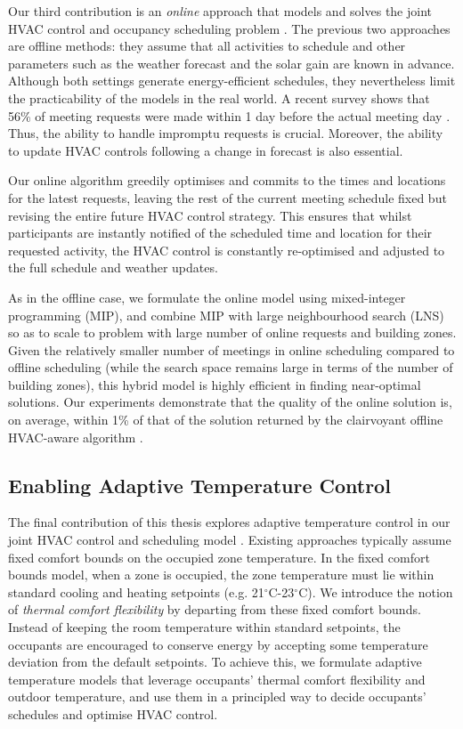 Our third contribution is an \emph{online} approach that models and solves the joint HVAC control and occupancy scheduling problem \citep{lim2016online}. The previous two approaches are offline methods: they assume that all activities to schedule and other parameters such as the weather forecast and the solar gain are known in advance. Although both settings generate energy-efficient schedules, they nevertheless limit the practicability of the models in the real world. A recent survey shows that 56\% of meeting requests were made within 1 day before the actual meeting day \citep{kwak2013tesla}. Thus, the ability to handle impromptu requests is crucial. Moreover, the ability to update HVAC controls following a change in forecast is also essential.

Our online algorithm greedily optimises and commits to the times and locations for the latest requests, leaving the rest of the current meeting schedule fixed but revising the entire future HVAC control strategy. This ensures that whilst participants are instantly notified of the scheduled time and location for their requested activity, the HVAC control is constantly re-optimised and adjusted to the full schedule and weather updates. 

As in the offline case, we formulate the online model using mixed-integer programming (MIP), and combine MIP with large neighbourhood search (LNS) so as to scale to problem with large number of online requests and building zones. Given the relatively smaller number of meetings in online scheduling compared to offline scheduling (while the search space remains large in terms of the number of building zones), this hybrid model is highly efficient in finding near-optimal solutions. Our experiments demonstrate that the quality of the online solution is, on average, within 1\% of that of the solution returned by the clairvoyant offline HVAC-aware algorithm \citep{lim2015large}.

\subsection{Enabling Adaptive Temperature Control}

The final contribution of this thesis explores adaptive temperature control in our joint HVAC control and scheduling model \citep{lim2016online}. Existing approaches typically assume fixed comfort bounds on the occupied zone temperature. In the fixed comfort bounds model, when a zone is occupied, the zone temperature must lie within standard cooling and heating setpoints (e.g. 21$^\circ$C-23$^\circ$C). We introduce the notion of \textsl{thermal comfort flexibility} by departing from these fixed comfort bounds. Instead of keeping the room temperature within standard setpoints, the occupants are encouraged to conserve energy by accepting some temperature deviation from the default setpoints. %
To achieve this, we formulate adaptive temperature models that leverage occupants' thermal comfort flexibility and outdoor temperature, and use them in a principled way to decide occupants' schedules and optimise HVAC control. 

